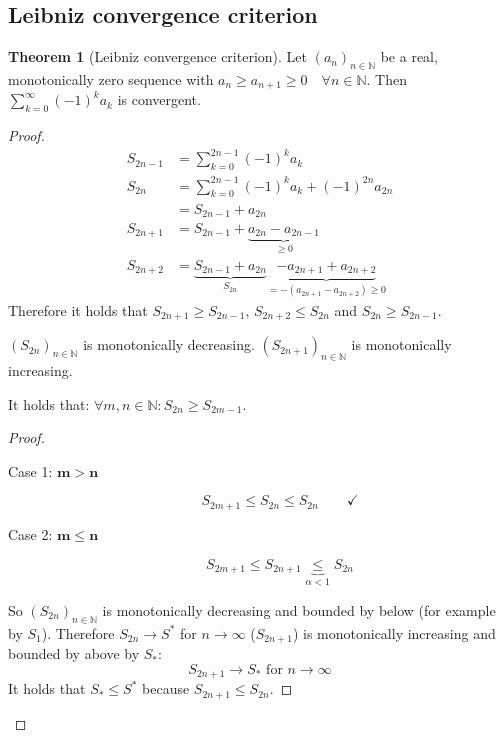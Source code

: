 \documentclass[a4paper,landscape,twocolumn]{article}
\theoremstyle{definition}
\newtheorem{theorem}{Theorem}
\newcommand\seq[1]{{\left(#1\right)}_{n \in \mathbb N}}
\begin{document}
\subsection{Leibniz convergence criterion}
\begin{theorem}[Leibniz convergence criterion]
  Let $\seq{a_n}$ be a real, monotonically zero sequence with $a_n \geq a_{n+1} \geq 0
  \quad\forall n \in \mathbb N$.
  Then $\sum_{k=0}^\infty (-1)^k a_k$ is convergent.
\end{theorem}
\begin{proof}
  \begin{align*}
    S_{2n-1} &= \sum_{k=0}^{2n-1} (-1)^{k} a_k \\
    S_{2n} &= \sum_{k=0}^{2n-1} (-1)^{k} a_k + (-1)^{2n} a_{2n} \\
      &= S_{2n-1} + a_{2n} \\
    S_{2n+1} &= S_{2n-1} + \underbrace{a_{2n} - a_{2n-1}}_{\geq 0} \\
    S_{2n+2} &= \underbrace{S_{2n-1} + a_{2n}}_{S_{2n}} \underbrace{- a_{2n+1} + a_{2n+2}}_{= -(a_{2n+1} - a_{2n+2}) \geq 0}
  \end{align*}
  Therefore it holds that $S_{2n+1} \geq S_{2n-1}$, $S_{2n+2} \leq S_{2n}$ and $S_{2n} \geq S_{2n-1}$.

  $\seq{S_{2n}}$ is monotonically decreasing.
  $\seq{S_{2n+1}}$ is monotonically increasing.

  It holds that: $\forall m,n \in \mathbb N: S_{2n} \geq S_{2m - 1}$.

  \begin{proof}
    \begin{description}
      \item[Case 1: $\mathbf{m > n}$]
        \[ S_{2m+1} \leq S_{2n} \leq S_{2n} \qquad\checkmark \]
      \item[Case 2: $\mathbf{m \leq n}$]
        \[ S_{2m+1} \leq S_{2n+1} \underbrace{\leq}_{\alpha < 1} S_{2n} \]
    \end{description}
    So $\seq{S_{2n}}$ is monotonically decreasing and bounded by below (for example by $S_1$).
    Therefore $S_{2n} \rightarrow S^*$ for $n \rightarrow \infty$ ($S_{2n+1}$) is monotonically increasing
    and bounded by above by $S_*$:
    \[ S_{2n+1} \rightarrow S_* \text{ for } n \to \infty \]
    It holds that $S_* \leq S^*$ because $S_{2n+1} \leq S_{2n}$.
  \end{proof}


\end{proof}
\end{document}
